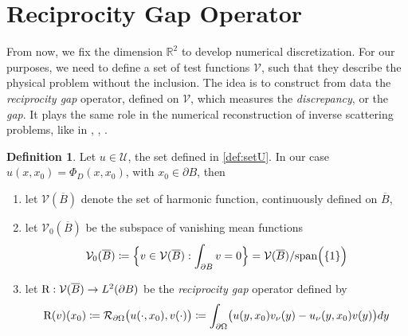 \documentclass[10pt, a4paper, twoside, openright]{book}
\theoremstyle{definition}
\newtheorem{definition}[subsection]{Definition}
\theoremstyle{plain}
\theoremstyle{plain}
\theoremstyle{plain}
\theoremstyle{plain}
\theoremstyle{plain}
\theoremstyle{plain}
\theoremstyle{plain}
\theoremstyle{plain}
\begin{document}
\section{Reciprocity Gap Operator}
From now, we fix the dimension $\mathbb{R}^2$ to develop numerical discretization. 
For our purposes, we need to define a set of test functions $\mathcal{V}$, such that they describe the physical problem without the inclusion. The idea is to construct from data the \emph{reciprocity gap} operator, defined on $\mathcal{V}$, which measures the \emph{discrepancy}, or the \emph{gap}.
It plays the same role in the numerical reconstruction of inverse scattering problems, like in \cite{colton-haddar:rg}, \cite{dicristo-sun:2006}, \cite{dicristo-sun:2007}.
\begin{definition}
\label{def:setV}
Let $u\in\mathcal{U}$, the set defined in \ref{def:setU}. In our case $u(x,x_0)=\Phi_D(x,x_0)$, with $x_0 \in \partial B$, then
\begin{enumerate}
 \item let $\mathcal{V}(\overline{B})$ denote the set of harmonic function, continuously defined on $\overline{B}$,
 \item let $\mathcal{V}_0(\overline{B})$ be the subspace of vanishing mean functions
 \begin{equation}
  \mathcal{V}_0(\overline{B})\coloneqq\Bigl\{v\in\mathcal{V}(\overline{B}):\int_{\partial B} v = 0\Bigr\}=\mathcal{V}(\overline{B})/\textup{span}\Bigl(\{1\}\Bigr)
 \end{equation}
 \item let $\textup{R} : \mathcal{V}(\overline{B})\to L^2(\partial B)$ be the \emph{reciprocity gap} operator defined by
\begin{equation}
 \textup{R}(v)(x_0)\coloneqq \mathcal{R}_{\partial\Omega}\bigl(u(\cdot,x_0),v(\cdot)\bigr)\coloneqq \int_{\partial \Omega}\bigl(u(y,x_0)v_\nu (y) - u_\nu(y,x_0)v(y)\bigr)dy
\end{equation}
\end{enumerate}
\end{definition}
\begin{figure}[tb]
\begin{center}
\end{center}
\end{figure}
\end{document}
